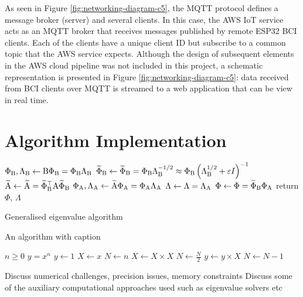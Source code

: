 As seen in Figure \ref{fig:networking-diagram-c5}, the MQTT protocol defines a message broker (server) and several clients. In this case, the AWS IoT service acts as an MQTT broker that receives messages published by remote ESP32 BCI clients. Each of the clients have a unique client ID but subscribe to a common topic that the AWS service expects. Although the design of subsequent elements in the AWS cloud pipeline was not included in this project, a schematic representation is presented in Figure \ref{fig:networking-diagram-c5}: data received from BCI clients over MQTT is streamed to a web application that can be view in real time.


\section{Algorithm Implementation}

\begin{algorithm}
\begin{algorithmic}
\State $\Phi_{{\textrm{B}}}, \Lambda_{{\textrm{B}}} \gets {\textrm{B}} \Phi_{{\textrm{B}}}=\Phi_{{\textrm{B}}} \Lambda_{{\textrm{B}}}$ 
\State $\widetilde{\Phi}_{{\textrm{B}}} \gets \widetilde{\Phi}_{{\textrm{B}}}=\Phi_{{\textrm{B}}} \Lambda_{{\textrm{B}}}^{-1 / 2} \approx \Phi_{{\textrm{B}}}\left(\Lambda_{{\textrm{B}}}^{1 / 2}+\varepsilon I\right)^{-1}$ 
\State $\widetilde{{\textrm{A}}} \gets \widetilde{{\textrm{A}}}=\widetilde{\Phi}_{{\textrm{B}}}^{\top} {\textrm{A}} \widetilde{\Phi}_{{\textrm{B}}}$ 
\State $\Phi_{{\textrm{A}}}, \Lambda_{{\textrm{A}}} \gets \widetilde{{\textrm{A}}} \Phi_{{\textrm{A}}}=\Phi_{{\textrm{A}}} \Lambda_{{\textrm{A}}}$ 
\State $\Lambda \gets \Lambda=\Lambda_{{\textrm{A}}}$ 
\State $\Phi \gets \Phi=\widetilde{\Phi}_{{\textrm{B}}} \Phi_{{\textrm{A}}}$ 
\State return $\Phi$, $\Lambda$ 
\end{algorithmic}
\caption{Generalised eigenvalue algorithm}
\end{algorithm}

\begin{algorithm}
\caption{An algorithm with caption}\label{alg:cap}
\begin{algorithmic}
\Require $n \geq 0$
\Ensure $y = x^n$
\State $y \gets 1$
\State $X \gets x$
\State $N \gets n$
    \State $X \gets X \times X$
    \State $N \gets \frac{N}{2}$  
    \State $y \gets y \times X$
    \State $N \gets N - 1$
\EndIf
\EndWhile
\end{algorithmic}
\end{algorithm}


Discuss numerical challenges, precision issues, memory constraints
Discuss some of the auxiliary computational approaches used such as eigenvalue solvers etc

